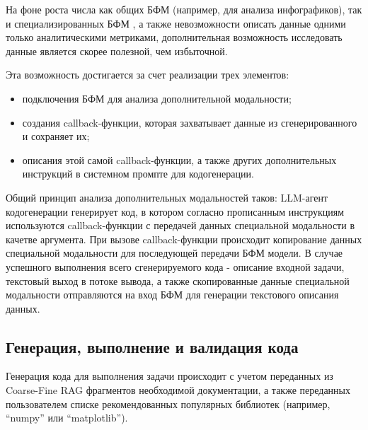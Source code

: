 \begin{enumerate}
На фоне роста числа как общих БФМ (например, для анализа инфографиков), так и 
специализированных БФМ \cite{alphafold3}, а также невозможности описать данные 
одними только аналитическими метриками, дополнительная возможность исследовать 
данные является скорее полезной, чем избыточной.

Эта возможность достигается за счет реализации трех элементов:
\begin{itemize}
    \item подключения БФМ для анализа дополнительной модальности;
    \item создания callback-функции, которая захватывает данные из сгенерированного и 
сохраняет их;
    \item описания этой самой callback-функции, а также других дополнительных инструкций
в системном промпте для кодогенерации. 
\end{itemize} 

Общий принцип анализа дополнительных модальностей таков: LLM-агент кодогенерации генерирует 
код, в котором согласно прописанным инструкциям используются callback-функции с передачей
данных специальной модальности в качетве аргумента. При вызове callback-функции происходит
копирование данных специальной модальности для последующей передачи БФМ модели. В случае
успешного выполнения всего сгенерируемого кода - описание входной задачи, текстовый выход
в потоке вывода, а также скопированные данные специальной модальности отправляются 
на вход БФМ для генерации текстового описания данных. 


\subsection{Генерация, выполнение и валидация кода} \label{ch3:sec1:subsec2}

Генерация кода для выполнения задачи происходит с учетом переданных из 
Coarse-Fine RAG фрагментов необходимой документации, а также переданных пользователем
списке рекомендованных популярных библиотек (например, ``numpy'' или ``matplotlib'').


\end{enumerate}

